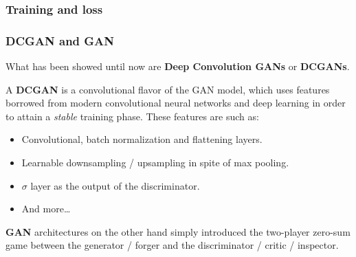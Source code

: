 \begin{frame}
    \frametitle{Training and loss}



\end{frame}

\begin{frame}
    \frametitle{DCGAN and GAN}
    What has been showed until now are \textbf{Deep Convolution GANs} or \textbf{DCGANs}. 
    
    A \textbf{DCGAN} is a convolutional flavor of the GAN model, which uses features borrowed from modern convolutional neural networks and deep learning in order to attain a \emph{stable} training phase. These features are such as:
    \begin{itemize}
        \item Convolutional, batch normalization and flattening layers.
        \item Learnable downsampling / upsampling in spite of max pooling.
        \item $\sigma$ layer as the output of the discriminator.
        \item And more\dots
    \end{itemize}

    \textbf{GAN} architectures on the other hand simply introduced the two-player zero-sum game between the generator / forger and the discriminator / critic / inspector.
\end{frame}

